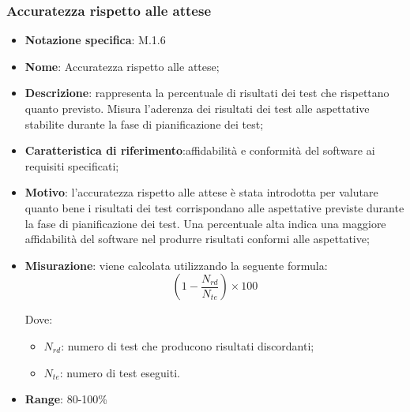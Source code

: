 \subsubsection{Accuratezza rispetto alle attese}
\begin{itemize}
    \item \textbf{Notazione specifica}: M.1.6
    \item \textbf{Nome}: Accuratezza rispetto alle attese;
    \item \textbf{Descrizione}: rappresenta la percentuale di risultati dei test che rispettano quanto previsto. Misura l'aderenza dei risultati dei test alle aspettative stabilite durante la fase di pianificazione dei test;
    \item \textbf{Caratteristica di riferimento}:affidabilità e conformità del software ai requisiti specificati;
    \item \textbf{Motivo}: l'accuratezza rispetto alle attese è stata introdotta per valutare quanto bene i risultati dei test corrispondano alle aspettative previste durante la fase di pianificazione dei test. Una percentuale alta indica una maggiore affidabilità del software nel produrre risultati conformi alle aspettative;
    \item \textbf{Misurazione}: viene calcolata utilizzando la seguente formula:
    \[
    (1 - \frac{N_{rd}}{N_{te}}) \times 100
    \]
    
    Dove:
    \begin{itemize}
        \item $N_{rd}$: numero di test che producono risultati discordanti;
        \item $N_{te}$: numero di test eseguiti.
    \end{itemize} 
    \item \textbf{Range}: 80-100\%
\end{itemize}